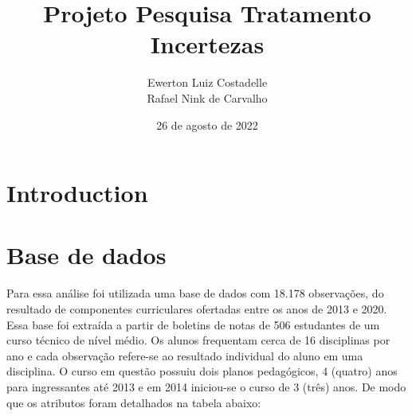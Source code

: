 \documentclass{article}
\title{Projeto Pesquisa Tratamento Incertezas}
\author{Ewerton Luiz Costadelle \\ Rafael Nink de Carvalho}
\date{26 de agosto de 2022}
\begin{document}
\maketitle

\section{Introduction}


\section{Base de dados}\label{base_de_dados}

Para essa análise foi utilizada uma base de dados com 18.178 observações, do resultado de componentes curriculares ofertadas entre os anos de 2013 e 2020. Essa base foi extraída a partir de boletins de notas de 506 estudantes de um curso técnico de nível médio. Os alunos frequentam cerca de 16 disciplinas por ano e cada observação refere-se ao resultado individual do aluno em uma disciplina. O curso em questão possuiu dois planos pedagógicos, 4 (quatro) anos para ingressantes até 2013 e em 2014 iniciou-se o curso de 3 (três) anos. De modo que os atributos foram detalhados na tabela abaixo: \\
\end{document}
